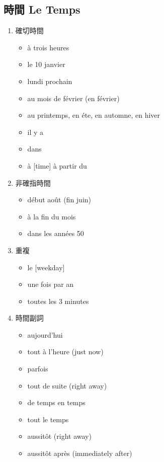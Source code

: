 \documentclass{book}
\begin{document}
        \subsection{時間 Le Temps}
            \begin{enumerate}
                \item 確切時間
                    \begin{itemize}
                        \item à trois heures
                        \item le 10 janvier
                        \item lundi prochain
                        \item au mois de février (en février)
                        \item au printemps, en éte, en automne, en hiver
                        \item il y a 
                        \item dans
                        \item à [time] à partir du
                    \end{itemize}
                \item 非確指時間
                    \begin{itemize}
                        \item début août (fin juin) 
                        \item à la fin du mois
                        \item dans les années 50
                    \end{itemize}
                \item 重複
                    \begin{itemize}
                        \item le [weekday]
                        \item une fois par an
                        \item toutes les 3 minutes
                    \end{itemize}
                \item 時間副詞
                    \begin{itemize}
                        \item aujourd'hui
                        \item tout à l'heure (just now)
                        \item parfois
                        \item tout de suite (right away)
                        \item de temps en temps
                        \item tout le temps 
                        \item aussitôt (right away)
                        \item aussitôt après (immediately after)
                    \end{itemize}
            \end{enumerate}
        
\end{document}
